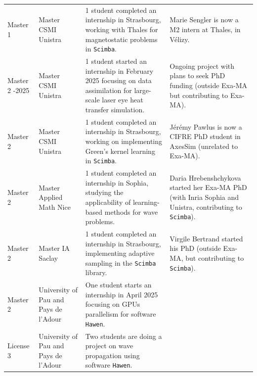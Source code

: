 \begin{landscape}
\begin{xltabular}{\linewidth}{X X X X }
      Master 1  
        & Master CSMI Unistra 
        & 1 student completed an internship in Strasbourg, working with Thales for magnetostatic problems in \texttt{Scimba}.
        & Marie Sengler is now a M2 intern at Thales, in Vélizy. \\[0.75em]
      
      Master 2 -2025 
        & Master CSMI Unistra 
        & 1 student started an internship in February 2025 focusing on data assimilation for large-scale laser eye heat transfer simulation.
        & Ongoing project with plans to seek PhD funding (outside Exa-MA but contributing to Exa-MA). \\[0.75em]
      
      Master 2  
        & Master CSMI Unistra 
        & 1 student completed an internship in Strasbourg, working on implementing Green's kernel learning in \texttt{Scimba}.
        & Jérémy Pawlus is now a CIFRE PhD student in AxesSim (unrelated to Exa-MA). \\[0.75em]
      
      Master 2  
        & Master Applied Math Nice 
        & 1 student completed an internship in Sophia, studying the applicability of learning-based methods for wave problems.
        & Daria Hrebenshchykova started her Exa-MA PhD (with Inria Sophia and Unistra, contributing to \texttt{Scimba}). \\[0.75em]
      
      Master 2  
        & Master IA Saclay 
        & 1 student completed an internship in Strasbourg, implementing adaptive sampling in the \texttt{Scimba} library.
        & Virgile Bertrand started his PhD (outside Exa-MA, but contributing to \texttt{Scimba}). \\[0.75em]
      
      Master 2  
        & University of Pau and Pays de l'Adour 
        & One student starts an internship in April 2025 focusing on GPUs parallelism for software \texttt{Hawen}.
        & \\[0.75em]
      
      License 3  
        & University of Pau and Pays de l'Adour 
        & Two students are doing a project on wave propagation using software \texttt{Hawen}.
        & \\[0.75em]
      

\end{xltabular}
\end{landscape}
